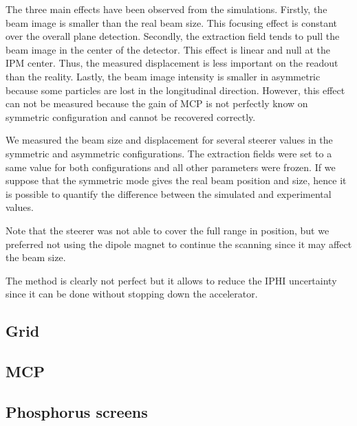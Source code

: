 \begin{refsection}
  The three main effects have been observed from the simulations. Firstly, the beam image is smaller than the real beam size. This focusing effect is constant over the overall plane detection. Secondly, the extraction field tends to pull the beam image in the center of the detector. This effect is linear and null at the IPM center. Thus, the measured displacement is less important on the readout than the reality. Lastly, the beam image intensity is smaller in asymmetric because some particles are lost in the longitudinal direction. However, this effect can not be measured because the gain of MCP is not perfectly know on symmetric configuration and cannot be recovered correctly.

  We measured the beam size and displacement for several steerer values in the symmetric and asymmetric configurations.
  The extraction fields were set to a same value for both configurations and all other parameters were frozen. If we suppose that the symmetric mode gives the real beam position and size, hence it is possible to quantify the difference between the simulated and experimental values.

  

  Note that the steerer was not able to cover the full range in position, but we preferred not using the dipole magnet to continue the scanning since it may affect the beam size.

  The method is clearly not perfect but it allows to reduce the IPHI uncertainty since it can be done without stopping down the accelerator.

  \subsection{Grid}

  


  \subsection{MCP}
  
  \subsection{Phosphorus screens}

\end{refsection}
